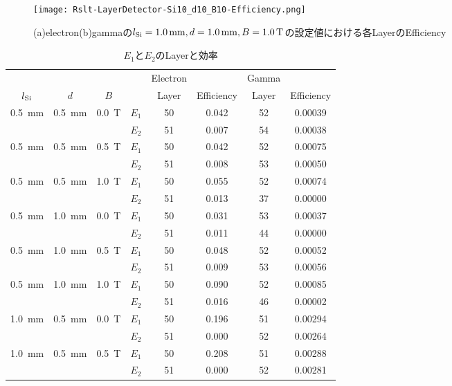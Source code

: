 \documentclass[a4paper,10pt]{jreport}
\begin{document}
\begin{figure}[H]
	\center
	\texttt{[image: Rslt-LayerDetector-Si10\_d10\_B10-Efficiency.png]}
	\caption{(a)electron(b)gammaの$l_{\rm{Si}}=\SI{1.0}{mm}, d=\SI{1.0}{mm}, B=\SI{1.0}{T}$の設定値における各LayerのEfficiency}
	\label{Rslt-LayerDetector-Si05_d05_B00-Efficiency}
\end{figure}

\begin{table}[H] 
	\center
	\caption{$E_1$と$E_2$のLayerと効率} \label{Tab-LayerDetector-E1E2-Layer-Effciency}
	\begin{tabular}{ccc|c|cc|cc}
		\hline
		 &  &  &  & Electron  &  & Gamma  &   \\
		$l_{\rm{Si}}$ & $d$ & $B$ &  & Layer & Efficiency &  Layer & Efficiency \\
		\hline \hline
		\SI{0.5}{mm} & \SI{0.5}{mm} & \SI{0.0}{T} & $E_1$ & 50 & 0.042 & 52 & 0.00039 \\
		&  &  & $E_2$ & 51 & 0.007 & 54 & 0.00038 \\
		\hline
		\SI{0.5}{mm} & \SI{0.5}{mm} & \SI{0.5}{T} & $E_1$ & 50 & 0.042 & 52 & 0.00075 \\
		  &  &  & $E_2$ & 51 & 0.008 & 53 & 0.00050 \\
		\hline
		\SI{0.5}{mm} & \SI{0.5}{mm} & \SI{1.0}{T} & $E_1$ & 50 & 0.055 & 52 & 0.00074 \\
		  &  &  & $E_2$ & 51 & 0.013 & 37 & 0.00000 \\
		\hline
		\SI{0.5}{mm} & \SI{1.0}{mm} & \SI{0.0}{T} & $E_1$ & 50 & 0.031 & 53 & 0.00037 \\
		  &  &  & $E_2$ & 51 & 0.011 & 44 & 0.00000 \\
		\hline
		\SI{0.5}{mm} & \SI{1.0}{mm} & \SI{0.5}{T} & $E_1$ & 50 & 0.048 & 52 & 0.00052 \\
		  &  &  & $E_2$ & 51 & 0.009 & 53 & 0.00056 \\
		\hline
		\SI{0.5}{mm} & \SI{1.0}{mm} & \SI{1.0}{T} & $E_1$ & 50 & 0.090 & 52 & 0.00085 \\
		  &  &  & $E_2$ & 51 & 0.016 & 46 & 0.00002 \\
		\hline
		\SI{1.0}{mm} & \SI{0.5}{mm} & \SI{0.0}{T} & $E_1$ & 50 & 0.196 & 51 & 0.00294 \\
		  &  &  & $E_2$ & 51 & 0.000 & 52 & 0.00264 \\
		\hline
		\SI{1.0}{mm} & \SI{0.5}{mm} & \SI{0.5}{T} & $E_1$ & 50 & 0.208 & 51 & 0.00288 \\
		  &  &  & $E_2$ & 51 & 0.000 & 52 & 0.00281 \\

\end{tabular}
\end{table}
\end{document}

